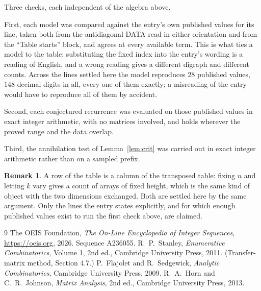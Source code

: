 \documentclass[11pt,a4paper]{article}
\theoremstyle{plain}
\theoremstyle{definition}
\newtheorem{remark}[theorem]{Remark}
\begin{document}
Three checks, each independent of the algebra above.

First, each model was compared against the entry's own published values for its line, taken
both from the antidiagonal DATA read in either orientation and from the ``Table starts''
block, and agrees at every available term. This is what ties a model to the table:
substituting the fixed index into the entry's wording is a reading of English, and a wrong
reading gives a different digraph and different counts. Across the lines settled here the
model reproduces $28$ published values, $148$ decimal digits in all, every one of
them exactly; a misreading of the entry would have to reproduce all of them by accident.

Second, each conjectured recurrence was evaluated on those published values in exact
integer arithmetic, with no matrices involved, and holds wherever the proved range and the
data overlap.

Third, the annihilation test of Lemma~\ref{lem:crit} was carried out in exact integer
arithmetic rather than on a sampled prefix.

\begin{remark}
A row of the table is a column of the transposed table: fixing $n$ and letting $k$ vary gives a
count of arrays of fixed height, which is the same kind of object with the two dimensions
exchanged. Both are settled here by the same argument. Only the lines the entry states
explicitly, and for which enough published values exist to run the first check above, are
claimed.
\end{remark}

\begin{thebibliography}{9}
 The OEIS Foundation, \emph{The On-Line Encyclopedia of Integer
Sequences}, \url{https://oeis.org}, 2026. Sequence A236055.
 R.~P.~Stanley, \emph{Enumerative Combinatorics}, Volume 1, 2nd ed.,
Cambridge University Press, 2011. (Transfer-matrix method, Section 4.7.)
 P.~Flajolet and R.~Sedgewick, \emph{Analytic Combinatorics}, Cambridge
University Press, 2009.
 R.~A.~Horn and C.~R.~Johnson, \emph{Matrix Analysis}, 2nd ed., Cambridge
University Press, 2013.
\end{thebibliography}
\end{document}
